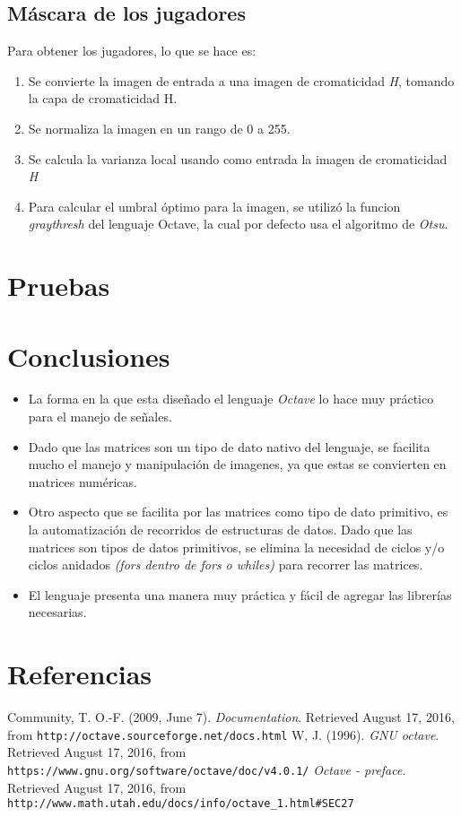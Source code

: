 \documentclass{IEEEtran}
\begin{document}
\subsection{M\'ascara de los jugadores}

Para obtener los jugadores, lo que se hace es:

\begin{enumerate}
\item Se convierte la imagen de entrada a una imagen de cromaticidad \emph{H}, tomando la capa de cromaticidad H.
\item Se normaliza la imagen en un rango de 0 a 255.
\item Se calcula la varianza local usando como entrada la imagen de cromaticidad \emph{H}
\item Para calcular el umbral \'optimo para la imagen, se utiliz\'o la funcion \emph{graythresh} del lenguaje Octave, la cual por defecto usa el algoritmo de \emph{Otsu}.
\end{enumerate}

\section{Pruebas}

\section{Conclusiones}

\begin{itemize}
\item La forma en la que esta dise\~nado el lenguaje \emph{Octave} lo hace muy pr\'actico para el manejo de se\~nales.
\item Dado que las matrices son un tipo de dato nativo del lenguaje, se facilita mucho el manejo y manipulaci\'on de imagenes, ya que estas se convierten en matrices num\'ericas.
\item Otro aspecto que se facilita por las matrices como tipo de dato primitivo, es la automatizaci\'on de recorridos de estructuras de datos. Dado que las matrices son tipos de datos primitivos, se elimina la necesidad de ciclos y/o ciclos anidados \emph{(fors dentro de fors o whiles)} para recorrer las matrices.
\item El lenguaje presenta una manera muy pr\'actica y f\'acil de agregar las librer\'ias necesarias.
\end{itemize}

\section{Referencias}

\begin{thebibliography}{99}

 Community, T. O.-F. (2009, June 7). \emph{Documentation}. Retrieved August 17, 2016, from \texttt{http://octave.sourceforge.net/docs.html}
 W, J. (1996). \emph{GNU octave}. Retrieved August 17, 2016, from \texttt{https://www.gnu.org/software/octave/doc/v4.0.1/}
 \emph{Octave - preface}. Retrieved August 17, 2016, from \texttt{http://www.math.utah.edu/docs/info/octave\_1.html\#SEC27}
\end{thebibliography}
\end{document}

